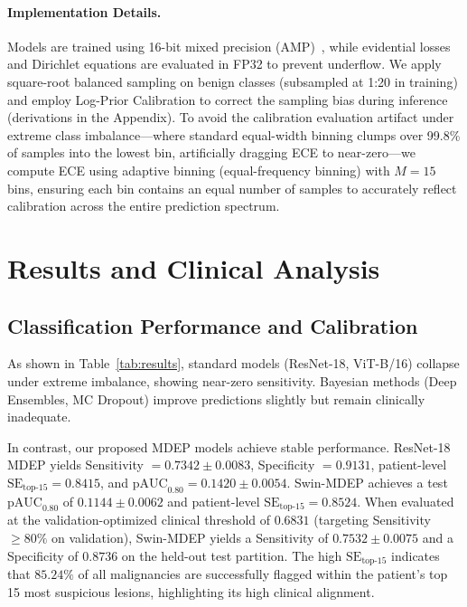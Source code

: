 \documentclass[letterpaper]{article} %
\begin{document}
\paragraph{Implementation Details.} Models are trained using 16-bit mixed precision (AMP)~\cite{micikevicius2018mixed}, while evidential losses and Dirichlet equations are evaluated in FP32 to prevent underflow. We apply square-root balanced sampling on benign classes (subsampled at 1:20 in training) and employ Log-Prior Calibration to correct the sampling bias during inference (derivations in the Appendix). To avoid the calibration evaluation artifact under extreme class imbalance—where standard equal-width binning clumps over 99.8\% of samples into the lowest bin, artificially dragging ECE to near-zero—we compute ECE using adaptive binning (equal-frequency binning) with $M=15$ bins, ensuring each bin contains an equal number of samples to accurately reflect calibration across the entire prediction spectrum.

\section{Results and Clinical Analysis}\label{sec:results}

\subsection{Classification Performance and Calibration}
As shown in Table~\ref{tab:results}, standard models (ResNet-18, ViT-B/16) collapse under extreme imbalance, showing near-zero sensitivity. Bayesian methods (Deep Ensembles, MC Dropout) improve predictions slightly but remain clinically inadequate. 

In contrast, our proposed MDEP models achieve stable performance. ResNet-18 MDEP yields Sensitivity $= 0.7342 \pm 0.0083$, Specificity $= 0.9131$, patient-level $\text{SE}_{\text{top-15}} = 0.8415$, and $\text{pAUC}_{0.80} = 0.1420 \pm 0.0054$. Swin-MDEP achieves a test $\text{pAUC}_{0.80}$ of $0.1144 \pm 0.0062$ and patient-level $\text{SE}_{\text{top-15}} = 0.8524$. When evaluated at the validation-optimized clinical threshold of $0.6831$ (targeting Sensitivity $\ge 80\%$ on validation), Swin-MDEP yields a Sensitivity of $0.7532 \pm 0.0075$ and a Specificity of $0.8736$ on the held-out test partition. The high $\text{SE}_{\text{top-15}}$ indicates that $85.24\%$ of all malignancies are successfully flagged within the patient's top 15 most suspicious lesions, highlighting its high clinical alignment.
\end{document}
